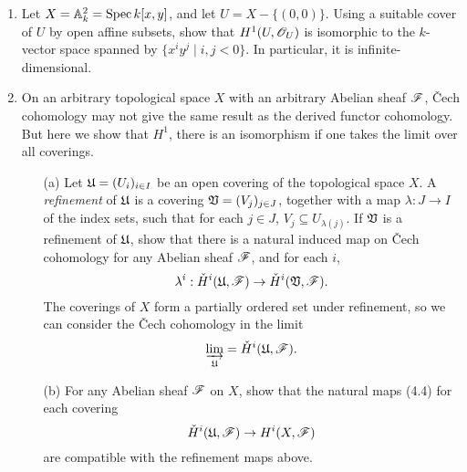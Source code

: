 \documentclass{article}
\begin{document}
\begin{enumerate} [label=\textbf{\arabic*.}, leftmargin=0em]
\begin{proof} $ $ \vspace{0pt}
\begin{enumerate} [label=(\alph*), leftmargin=0cm]

\item 

\end{enumerate}
\end{proof}

\item Let $X = \mathbb{A}_k^2 = \operatorname{Spec}{k[x, y]}$, and let $U = X - \{ (0, 0) \}$.
Using a suitable cover of $U$ by open affine subsets, show that $H^1(U, \mathscr{O}_U)$ is isomorphic to the $k$-vector space spanned by $\{ x^i y^j \mid i, j < 0 \}$.
In particular, it is infinite-dimensional.

\item On an arbitrary topological space $X$ with an arbitrary Abelian sheaf $\mathscr{F}$, Čech cohomology may not give the same result as the derived functor cohomology.
But here we show that $H^1$, there is an isomorphism if one takes the limit over all coverings.
\begin{itemize}
  \item[(a)] Let $\mathfrak{U} = (U_i)_{i \in I}$ be an open covering of the topological space $X$.
  A \textit{refinement} of $\mathfrak{U}$ is a covering $\mathfrak{V} = (V_j)_{j \in J}$, together with a map $\lambda : J \to I$ of the index sets, such that for each $j \in J$, $V_j \subseteq U_{\lambda(j)}$.
  If $\mathfrak{V}$ is a refinement of $\mathfrak{U}$, show that there is a natural induced map on Čech cohomology for any Abelian sheaf $\mathscr{F}$, and for each $i$,
  \begin{equation*}
    \lambda^i : \check{H}^i(\mathfrak{U}, \mathscr{F}) \to \check{H}^i(\mathfrak{V}, \mathscr{F}).
  \end{equation*}
  The coverings of $X$ form a partially ordered set under refinement, so we can consider the Čech cohomology in the limit
  \begin{equation*}
    \varinjlim_{\mathfrak{U}} = \check{H}^i(\mathfrak{U}, \mathscr{F}).
  \end{equation*}

  \item[(b)]  For any Abelian sheaf $\mathscr{F}$ on $X$, show that the natural maps (4.4) for each covering
  \begin{equation*}
    \check{H}^i(\mathfrak{U}, \mathscr{F}) \to H^i(X, \mathscr{F})
  \end{equation*}
  are compatible with the refinement maps above.


\end{itemize}
\end{enumerate}
\end{document}
